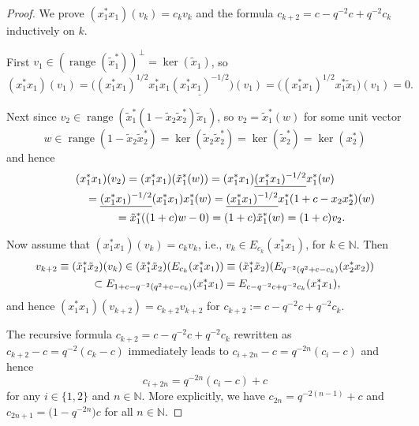 \begin{proof} We prove $( x_{1}^{\ast}x_{1}) ( v_{k})=c_{k}v_{k}$ and the formula $c_{k+2}=c-q^{-2}c+q^{-2}c_{k}$ inductively on
$k$.

First $v_{1}\in( \operatorname{range}( \tilde{x}_{1}^{\ast
}) ) ^{\perp}=\ker( \tilde{x}_{1}) $, so
\[
( x_{1}^{\ast}x_{1}) ( v_{1}) =\big( (
x_{1}^{\ast}x_{1}) ^{1/2}x_{1}^{\ast}x_{1}\underline{(
x_{1}^{\ast}x_{1}) ^{-1/2}}\big) ( v_{1}) =\big(
( x_{1}^{\ast}x_{1}) ^{1/2}x_{1}^{\ast}\tilde{x}_{1}\big)( v_{1}) =0.
\]

Next since $v_{2}\in\operatorname{range}( \tilde{x}_{1}^{\ast}(1-\tilde{x}_{2}\tilde{x}_{2}^{\ast}) \tilde{x}_{1}) $, so
$v_{2}=\tilde{x}_{1}^{\ast}(w) $ for some unit vector
\[
w\in\operatorname{range}( 1-\tilde{x}_{2}\tilde{x}_{2}^{\ast})
=\ker( \tilde{x}_{2}\tilde{x}_{2}^{\ast}) =\ker( \tilde
{x}_{2}^{\ast}) =\ker( x_{2}^{\ast})
\]
and hence
\begin{gather*}
( x_{1}^{\ast}x_{1}) ( v_{2}) =( x_{1}^{\ast
}x_{1}) ( \tilde{x}_{1}^{\ast}(w) ) =(
x_{1}^{\ast}x_{1}) \underline{( x_{1}^{\ast}x_{1})
^{-1/2}}x_{1}^{\ast}(w)
\\
\hphantom{( x_{1}^{\ast}x_{1}) ( v_{2})}{}
=\underline{( x_{1}^{\ast}x_{1}) ^{-1/2}}( x_{1}^{\ast
}x_{1}) x_{1}^{\ast}(w) =\underline{( x_{1}^{\ast
}x_{1}) ^{-1/2}}x_{1}^{\ast}( 1+c-x_{2}x_{2}^{\ast})
(w)\\
\hphantom{( x_{1}^{\ast}x_{1}) ( v_{2})}{}
=\tilde{x}_{1}^{\ast}( ( 1+c) w-0) =(
1+c) \tilde{x}_{1}^{\ast}(w) =( 1+c) v_{2}.
\end{gather*}

Now assume that $( x_{1}^{\ast}x_{1}) ( v_{k})
=c_{k}v_{k}$, i.e., $v_{k}\in E_{c_{k}}( x_{1}^{\ast}x_{1}) $, for
$k\in\mathbb{N}$. Then
\begin{gather*}
v_{k+2}\equiv( \tilde{x}_{1}^{\ast}\tilde{x}_{2}) (
v_{k}) \in( \tilde{x}_{1}^{\ast}\tilde{x}_{2}) (
E_{c_{k}}( x_{1}^{\ast}x_{1}) ) \equiv( \tilde
{x}_{1}^{\ast}\tilde{x}_{2}) ( E_{q^{-2}( q^{2}+c-c_{k}) }( x_{2}^{\ast}x_{2}) )
\\
\hphantom{v_{k+2}}{}
\subset E_{1+c-q^{-2}( q^{2}+c-c_{k}) }( x_{1}^{\ast}%
x_{1}) =E_{c-q^{-2}c+q^{-2}c_{k}}( x_{1}^{\ast}x_{1}) ,
\end{gather*}
and hence $( x_{1}^{\ast}x_{1}) ( v_{k+2})
=c_{k+2}v_{k+2}$ for $c_{k+2}:=c-q^{-2}c+q^{-2}c_{k}$.

The recursive formula $c_{k+2}=c-q^{-2}c+q^{-2}c_{k}$ rewritten as
$c_{k+2}-c=q^{-2}( c_{k}-c) $ immediately leads to $c_{i+2n}
-c=q^{-2n}( c_{i}-c) $ and hence
\[
c_{i+2n}=q^{-2n}( c_{i}-c) +c
\]
for any $i\in\{ 1,2\} $ and $n\in\mathbb{N}$. More explicitly, we
have $c_{2n}=q^{-2( n-1) }+c$ and $c_{2n+1}=\big(1-q^{-2n}\big) c$ for all $n\in\mathbb{N}$.
\end{proof}


